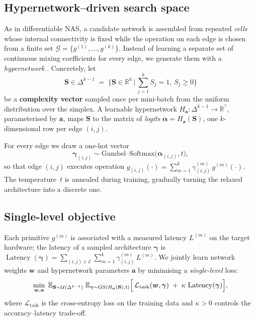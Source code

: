\documentclass{article}
\begin{document}
\subsection{Hypernetwork–driven search space}

As in differentiable NAS, a candidate network is assembled from repeated \emph{cells} whose internal connectivity is fixed while the operation on each edge is chosen from a finite set $\mathcal G=\{g^{(1)},\dots,g^{(k)}\}$.  
Instead of learning a separate set of continuous mixing coefficients for every edge, we generate them with a \emph{hypernetwork} \cite{yakovlev2021neural}.  
Concretely, let  
\[
\mathbf S\in\Delta^{k-1}\;=\;\bigl\{\mathbf S\in\mathbb R^{k}\,\bigl|\,\sum_{j=1}^kS_j=1,\,S_j\!\ge\!0\bigr\}
\]
be a \textbf{complexity vector} sampled once per mini-batch from the uniform distribution over the simplex.  
A learnable hypernetwork $H_{\boldsymbol a}\colon\Delta^{k-1}\to\mathbb R^{?}$, parameterised by $\boldsymbol a$, maps $\mathbf S$ to the matrix of \emph{logits} $\boldsymbol\alpha=H_{\boldsymbol a}(\mathbf S)$, one $k$-dimensional row per edge $(i,j)$.

For every edge we draw a one-hot vector
\[
\boldsymbol\gamma_{(i,j)}\sim\text{Gumbel–Softmax}\bigl(\boldsymbol\alpha_{(i,j)},t\bigr),
\]
so that edge $(i,j)$ executes operation 
$g_{(i,j)}( \cdot )=\sum_{m=1}^k\gamma^{(m)}_{(i,j)}\,g^{(m)}(\cdot)$.
The temperature~$t$ is annealed during training, gradually turning the relaxed architecture into a discrete one.

\subsection{Single-level objective}

Each primitive $g^{(m)}$ is associated with a measured latency $L^{(m)}$ on the target hardware; the latency of a sampled architecture $\boldsymbol\gamma$ is  
$
\operatorname{Latency}(\boldsymbol\gamma)=\sum_{(i,j)\in\mathcal E}\sum_{m=1}^{k}\gamma^{(m)}_{(i,j)}\,L^{(m)}.
$
We jointly learn network weights $\boldsymbol w$ and hypernetwork parameters $\boldsymbol a$ by minimising a \emph{single-level} loss:
\[
\min_{\boldsymbol w,\boldsymbol a}\;
\mathbb E_{\mathbf S\sim\mathcal U(\Delta^{k-1})}
\;\mathbb E_{\boldsymbol\gamma\sim\mathrm{GS}(H_{\boldsymbol a}(\mathbf S),t)}
\Bigl[\,\mathcal L_{\text{task}}(\boldsymbol w,\boldsymbol\gamma)\;
+\;\kappa\,\operatorname{Latency}(\boldsymbol\gamma)\Bigr],
\]
where $\mathcal L_{\text{task}}$ is the cross-entropy loss on the training data and $\kappa>0$ controls the accuracy–latency trade-off.






\end{document}
